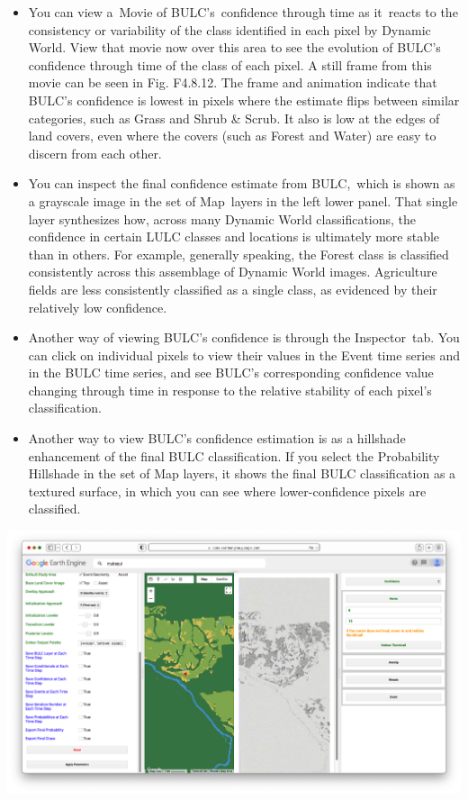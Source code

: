 \documentclass[
  letterpaper,
  DIV=11,
  numbers=noendperiod]{scrreprt}
\providecommand{\tightlist}{%
  \setlength{\itemsep}{0pt}\setlength{\parskip}{0pt}}\usepackage{longtable,booktabs,array}
\begin{document}
\begin{itemize}
\tightlist
\item
  You can view a~Movie of BULC's~confidence through time as it~reacts to
  the consistency or variability of the class identified in each pixel
  by Dynamic World. View that movie now over this area to see the
  evolution of BULC's confidence through time of the class of each
  pixel. A still frame from this movie can be seen in Fig. F4.8.12. The
  frame and animation indicate that BULC's confidence is lowest in
  pixels where the estimate flips between similar categories, such as
  Grass and Shrub \& Scrub. It also is low at the edges of land covers,
  even where the covers (such as Forest and Water) are easy to discern
  from each other. ~
\item
  You can inspect the final confidence estimate from BULC,~which is
  shown as a grayscale image in the set of Map~layers in the left lower
  panel. That single layer synthesizes how, across many Dynamic World
  classifications, the confidence in certain LULC classes and locations
  is ultimately more stable than in others. For example, generally
  speaking, the Forest class is classified consistently across this
  assemblage of Dynamic World images. Agriculture fields are less
  consistently classified as a single class, as evidenced by their
  relatively low confidence.
\item
  Another way of viewing BULC's confidence is through the Inspector~tab.
  You can click on individual pixels to view their values in the Event
  time series and in the BULC time series, and see BULC's corresponding
  confidence value changing through time in response to the relative
  stability of each pixel's classification.
\item
  Another way to view BULC's confidence estimation is as a hillshade
  enhancement of the final BULC classification. If you select the
  Probability Hillshade in the set of Map layers, it shows the final
  BULC classification as a textured surface, in which you can see where
  lower-confidence pixels are classified.
\end{itemize}

\includegraphics{./F4/image40.png}
\end{document}
